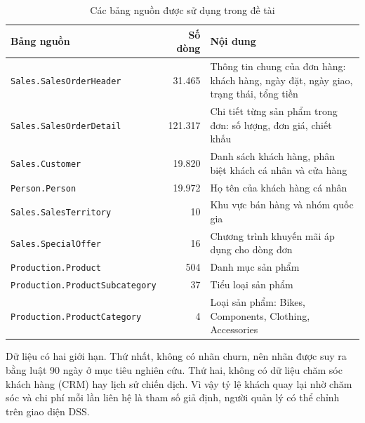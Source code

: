 \begin{table}[!htbp]
\centering\small
\caption{Các bảng nguồn được sử dụng trong đề tài}
\label{tab:bang_nguon}
\begin{tabular}{lrp{6.6cm}}
\toprule
\textbf{Bảng nguồn} & \textbf{Số dòng} & \textbf{Nội dung} \\
\midrule
\texttt{Sales.SalesOrderHeader} & 31.465 & Thông tin chung của đơn hàng: khách hàng, ngày đặt, ngày giao, trạng thái, tổng tiền \\
\texttt{Sales.SalesOrderDetail} & 121.317 & Chi tiết từng sản phẩm trong đơn: số lượng, đơn giá, chiết khấu \\
\texttt{Sales.Customer} & 19.820 & Danh sách khách hàng, phân biệt khách cá nhân và cửa hàng \\
\texttt{Person.Person} & 19.972 & Họ tên của khách hàng cá nhân \\
\texttt{Sales.SalesTerritory} & 10 & Khu vực bán hàng và nhóm quốc gia \\
\texttt{Sales.SpecialOffer} & 16 & Chương trình khuyến mãi áp dụng cho dòng đơn \\
\texttt{Production.Product} & 504 & Danh mục sản phẩm \\
\texttt{Production.ProductSubcategory} & 37 & Tiểu loại sản phẩm \\
\texttt{Production.ProductCategory} & 4 & Loại sản phẩm: Bikes, Components, Clothing, Accessories \\
\bottomrule
\end{tabular}
\end{table}

Dữ liệu có hai giới hạn. Thứ nhất, không có nhãn churn, nên nhãn được suy ra bằng luật 90 ngày ở mục tiêu nghiên cứu. Thứ hai, không có dữ liệu chăm sóc khách hàng (CRM) hay lịch sử chiến dịch. Vì vậy tỷ lệ khách quay lại nhờ chăm sóc và chi phí mỗi lần liên hệ là tham số giả định, người quản lý có thể chỉnh trên giao diện DSS.
